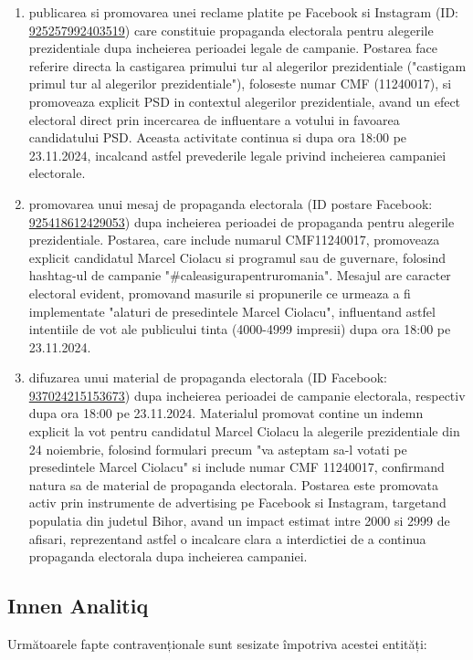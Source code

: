 \documentclass[a4paper,12pt]{article}
\begin{document}
\begin{enumerate}[leftmargin=*, label=\arabic*.)]
    \item publicarea si promovarea unei reclame platite pe Facebook si Instagram (ID: \href{https://www.facebook.com/ads/library/?id=925257992403519}{925257992403519}) care constituie propaganda electorala pentru alegerile prezidentiale dupa incheierea perioadei legale de campanie. Postarea face referire directa la castigarea primului tur al alegerilor prezidentiale ("castigam primul tur al alegerilor prezidentiale"), foloseste numar CMF (11240017), si promoveaza explicit PSD in contextul alegerilor prezidentiale, avand un efect electoral direct prin incercarea de influentare a votului in favoarea candidatului PSD. Aceasta activitate continua si dupa ora 18:00 pe 23.11.2024, incalcand astfel prevederile legale privind incheierea campaniei electorale.
    \item promovarea unui mesaj de propaganda electorala (ID postare Facebook: \href{https://www.facebook.com/ads/library/?id=925418612429053}{925418612429053}) dupa incheierea perioadei de propaganda pentru alegerile prezidentiale. Postarea, care include numarul CMF11240017, promoveaza explicit candidatul Marcel Ciolacu si programul sau de guvernare, folosind hashtag-ul de campanie "\#caleasigurapentruromania". Mesajul are caracter electoral evident, promovand masurile si propunerile ce urmeaza a fi implementate "alaturi de presedintele Marcel Ciolacu", influentand astfel intentiile de vot ale publicului tinta (4000-4999 impresii) dupa ora 18:00 pe 23.11.2024.
    \item difuzarea unui material de propaganda electorala (ID Facebook: \href{https://www.facebook.com/ads/library/?id=937024215153673}{937024215153673}) dupa incheierea perioadei de campanie electorala, respectiv dupa ora 18:00 pe 23.11.2024. Materialul promovat contine un indemn explicit la vot pentru candidatul Marcel Ciolacu la alegerile prezidentiale din 24 noiembrie, folosind formulari precum "va asteptam sa-l votati pe presedintele Marcel Ciolacu" si include numar CMF 11240017, confirmand natura sa de material de propaganda electorala. Postarea este promovata activ prin instrumente de advertising pe Facebook si Instagram, targetand populatia din judetul Bihor, avand un impact estimat intre 2000 si 2999 de afisari, reprezentand astfel o incalcare clara a interdictiei de a continua propaganda electorala dupa incheierea campaniei.
\end{enumerate}

\vspace{0.5cm}

\subsection{Innen Analitiq}
Următoarele fapte contravenționale sunt sesizate împotriva acestei entități:
\end{document}
